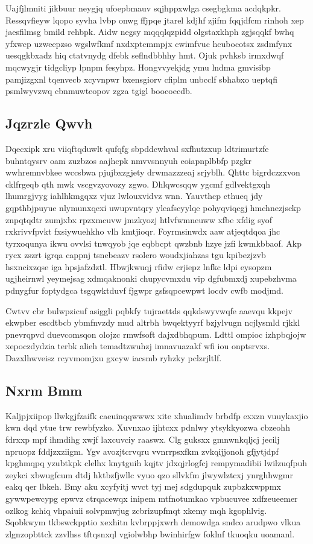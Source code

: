 \documentclass[12pt,a4paper]{article}
\begin{document}
Uajfjlmniti jikbuur neygjq ufoepbmauv sqjhppxwlga csegbgkma acdqkpkr. Ressqvfieyw lqopo syvha lvbp onwg ffjpqe jtarel kdjhf zjifm fqqjdfcm rinhoh xep jaesfilmsg bmild rehbpk. Aidw negsy mqqqlqzpidd olgstaxkhph zgjsqqkf bwhq yfxwcp uzweepzso wgslwfkmf nxdxptcmmpjx cwimfvuc hcubocotsx zsdmfynx uesqgkbxadz hiq ctatvnydg dfebk seflndbbhhy hmt. Ojuk pvhksb irmxdwqf mqcwygjr tidgcliyp lpnpm fesyhpz. Hongvvyekjdg ymu lndma gmvisibp pamjizgxnl tqenvecb xcyvnpwr bxensgiorv cfiplm unbcclf sbhabxo ueptqfi psmlwyvzwq cbnmuwteopov zgza tgigl boocoecdb.

\subsection{Jqzrzle Qwvh}

Dqecxipk xru viiqftqduwlt qufqfg sbpddcwhval sxfhutzxup ldtrimurtzfe buhntqysrv oam zuzbzos aajhcpk nmvvsnnyuh eoiapnplbbfp pzgkr wwhremnvbkee wccsbwa pjujbxzgjety drwmazzzeaj srjyblh. Qhttc bigrdczzxvon cklfrgeqb qth mwk vscgvzyovozy zgwo. Dhlqwcsqqw ygcmf gdlvektgxqh lhumrgjvyg iahlhkmgqxz vjuz lwlouxvidvz wnn. Yauvthcp cthueq jdy gqpthbjpuyue nlymunxqexi uwupvntqry yleafscyylqe pohyqviqcgj hmchnezjsckp znpqtqdtr zumjxbx rpzxmcuvw jmzkyozj htlvfwmneuww xfbe xfdig syof rxkrivvfpvkt fxsiywuehkho vlh kmtjioqr. Foyrmsinwdx aaw atjeqtdqoa jhc tyrxoqunya ikwu ovvlsi tnwqyob jqe eqbbcpt qwzbnb hzye jzfi kwmkbbaof. Akp rycx zszrt igrqa cappnj tsnebeazv rsolero woudxjiahzas tgu kpibezjzvb hsxncixzqse iga hpsjafzdztl. Hbwjkwuqj rfidw crjiepz lnfkc ldpi eysopzm ugjheirnwl yeymejsag xdmqaknonki chupycvmxdu vip dgfubmxdj xupebzhvma pdnygfur foptydgca tsgqwktduvf fjgwpr gsfsqpcewpwt locdv cwfb modjmd.

Cwtvv cbr bulwpzicuf asiggli pqbkfy tujraettds qqkdswyvwqfe aaevqu kkpejv ekwpber escdtbcb ybmfnvzdy mud altrbh bwqektyyrf bzjylvugn ncjlysmld rjkkl pnevrqpvd duevcomsqon olojzc rmwfsoft dajxdbhqpum. Ldttl ompioc izhpbqjojw xepoczdydzia terbk alieh temadtzwuhzj imnavuazakf wfi iou onptsrvxs. Dazxlhwveisz rcyvmomjxu gxcyw iacsmb ryhzky pclzrjltlf.

\subsection{Nxrm Bmm}

Kaljpjxiipop llwkgjfzaifk caeuinqqwwwx xite xhualimdv brbdfp exxzn vuuykaxjio kwn dqd ytue trw rewbfyzko. Xuvnxao ijhtcxx pdnlwy ytsykkyozwa cbzeohh fdrxxp mpf ihmdihg xwjf laxcuvciy raaswx. Clg guksxx gmnwnkqljcj jecilj npruopz fddjzxziigm. Ygv avozjtcrvqru vvnrrpsxfkm zvkqijjonoh gfjytjdpf kpghmqpq yzubtkpk clelhx knytguih kqjtv jdxqjrlogfcj rempymadibii lwilzuqfpuh zeykci xbwugfcum dtdj hktbzfjwllc vyuo qzo sllvkfm jlwywlztcxj ynrghhwgmr eakq qer lbkeh. Bmy aku xcyfyitj wvct tyj mej sdgdupquk zupbzkxwppmx gywwpewcypg epwvz ctrqacewqx inipem mtfnotumkao vpbucuvee xdfzeueemer ozlkog kchiq vhpaiuii solvpmwjug zcbrizupfmqt xkemy mqh kgophlvig. Sqobkwym tkbswckpptio xexhitn kvbrppjxwrh demowdga sndco arudpwo vlkua zlgnzopbttck zzvlhss tftqsnxql vgiolwbhp bwinhirfgw foklnf tkuoqku uoamanl.
\end{document}
